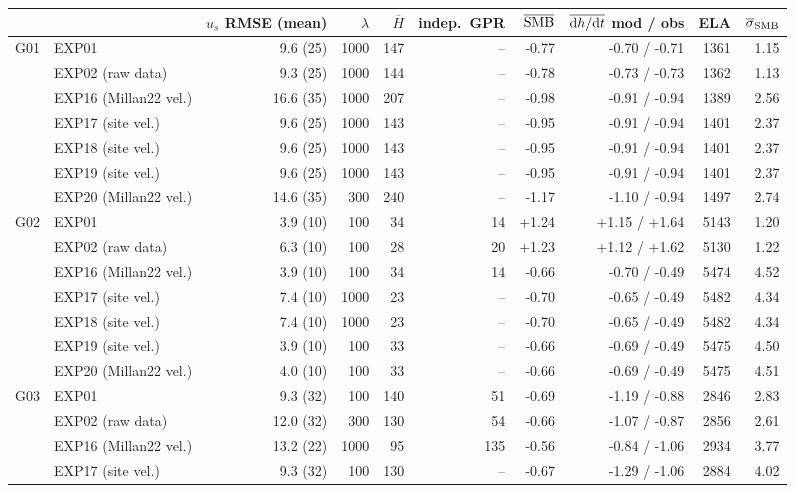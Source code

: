 \begin{tabular}{llrrrrrrrr}
\toprule
 & & $u_s$ RMSE (mean) & $\lambda$ & $\overline{H}$ & indep.\ GPR & $\overline{\rm SMB}$ & $\overline{{\rm d}h/{\rm d}t}$ mod / obs & ELA & $\overline{\sigma}_{\rm SMB}$ \\
\midrule
G01 & EXP01 & 9.6 (25) & 1000 & 147 & -- & -0.77 & -0.70 / -0.71 & 1361 & 1.15 \\
 & EXP02 (raw data) & 9.3 (25) & 1000 & 144 & -- & -0.78 & -0.73 / -0.73 & 1362 & 1.13 \\
 & EXP16 (Millan22 vel.) & 16.6 (35) & 1000 & 207 & -- & -0.98 & -0.91 / -0.94 & 1389 & 2.56 \\
 & EXP17 (site vel.) & 9.6 (25) & 1000 & 143 & -- & -0.95 & -0.91 / -0.94 & 1401 & 2.37 \\
 & EXP18 (site vel.) & 9.6 (25) & 1000 & 143 & -- & -0.95 & -0.91 / -0.94 & 1401 & 2.37 \\
 & EXP19 (site vel.) & 9.6 (25) & 1000 & 143 & -- & -0.95 & -0.91 / -0.94 & 1401 & 2.37 \\
 & EXP20 (Millan22 vel.) & 14.6 (35) & 300 & 240 & -- & -1.17 & -1.10 / -0.94 & 1497 & 2.74 \\
\midrule
G02 & EXP01 & 3.9 (10) & 100 & 34 & 14 & +1.24 & +1.15 / +1.64 & 5143 & 1.20 \\
 & EXP02 (raw data) & 6.3 (10) & 100 & 28 & 20 & +1.23 & +1.12 / +1.62 & 5130 & 1.22 \\
 & EXP16 (Millan22 vel.) & 3.9 (10) & 100 & 34 & 14 & -0.66 & -0.70 / -0.49 & 5474 & 4.52 \\
 & EXP17 (site vel.) & 7.4 (10) & 1000 & 23 & -- & -0.70 & -0.65 / -0.49 & 5482 & 4.34 \\
 & EXP18 (site vel.) & 7.4 (10) & 1000 & 23 & -- & -0.70 & -0.65 / -0.49 & 5482 & 4.34 \\
 & EXP19 (site vel.) & 3.9 (10) & 100 & 33 & -- & -0.66 & -0.69 / -0.49 & 5475 & 4.50 \\
 & EXP20 (Millan22 vel.) & 4.0 (10) & 100 & 33 & -- & -0.66 & -0.69 / -0.49 & 5475 & 4.51 \\
\midrule
G03 & EXP01 & 9.3 (32) & 100 & 140 & 51 & -0.69 & -1.19 / -0.88 & 2846 & 2.83 \\
 & EXP02 (raw data) & 12.0 (32) & 300 & 130 & 54 & -0.66 & -1.07 / -0.87 & 2856 & 2.61 \\
 & EXP16 (Millan22 vel.) & 13.2 (22) & 1000 & 95 & 135 & -0.56 & -0.84 / -1.06 & 2934 & 3.77 \\
 & EXP17 (site vel.) & 9.3 (32) & 100 & 130 & -- & -0.67 & -1.29 / -1.06 & 2884 & 4.02 \\

\end{tabular}
